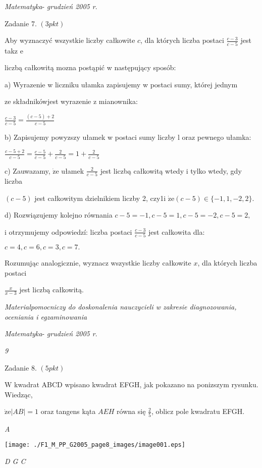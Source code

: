 \documentclass[a4paper,12pt]{article}
\begin{document}
{\it Matematyka}- {\it grudzień 2005 r}.

Zadanie 7. $(3pkt)$

Aby wyznaczyć wszystkie liczby całkowite $c$, dla których liczba postaci $\displaystyle \frac{c-3}{c-5}$ jest takz $\mathrm{e}$

liczbą całkowitą mozna postąpić w następujący sposób:

a) Wyrazenie w liczniku ułamka zapisujemy w postaci sumy, której jednym

ze składnikówjest wyrazenie z mianownika:

$\displaystyle \frac{c-3}{c-5}=\frac{(c-5)+2}{c-5}$

b) Zapisujemy powyzszy ułamek w postaci sumy liczby l oraz pewnego ułamka:

$\displaystyle \frac{c-5+2}{c-5}=\frac{c-5}{c-5}+\frac{2}{c-5}=1+\frac{2}{c-5}$

c) Zauwazamy, $\dot{\mathrm{z}}\mathrm{e}$ ułamek $\displaystyle \frac{2}{c-5}$ jest liczbą całkowitą wtedy i tylko wtedy, gdy liczba

$(c-5)$ jest całkowitym dzielnikiem liczby 2, czy1i $\dot{\mathrm{z}}\mathrm{e}(c-5)\in\{-1,1,-2,2\}.$

d) Rozwiązujemy kolejno równania $c-5=-1, c-5=1, c-5=-2, c-5=2,$

i otrzymujemy odpowiedzí: liczba postaci $\displaystyle \frac{c-3}{c-5}$ jest całkowita dla:

$c=4,c=6,c=3,c=7.$

Rozumując analogicznie, wyznacz wszystkie liczby całkowite $x$, dla których liczba postaci

$\displaystyle \frac{x}{x-3}$ jest liczbą całkowitą.





{\it Materialpomocniczy do doskonalenia nauczycieli w zakresie diagnozowania, oceniania i egzaminowania}

{\it Matematyka}- {\it grudzień 2005 r}.

{\it 9}

Zadanie 8. $(5pkt)$

$\mathrm{W}$ kwadrat ABCD wpisano kwadrat EFGH, jak pokazano na ponizszym rysunku. Wiedząc,

$\dot{\mathrm{z}}\mathrm{e}|AB|=1$ oraz tangens kąta $AEH$ równa się $\displaystyle \frac{2}{5}$, oblicz pole kwadratu EFGH.

{\it A}
\begin{center}
\texttt{[image: ./F1\_M\_PP\_G2005\_page8\_images/image001.eps]}
\end{center}
{\it D  G  C}
\end{document}
